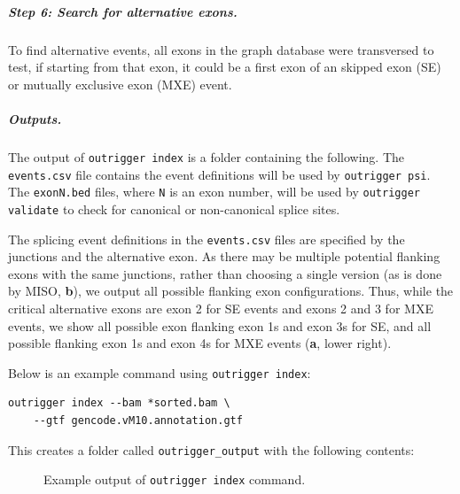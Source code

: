 \subparagraph{Step 6: Search for alternative exons.} To find alternative events, all exons in the graph database were transversed to test, if starting from that exon, it could be a first exon of an skipped exon (SE) or mutually exclusive exon (MXE) event.

\subparagraph{Outputs.} The output of \texttt{outrigger index} is a folder containing the following. The \texttt{events.csv} file contains the event definitions will be used by \texttt{outrigger psi}. The \texttt{exonN.bed} files, where \texttt{N} is an exon number, will be used by \texttt{outrigger validate} to check for canonical or non-canonical splice sites.

The splicing event definitions in the \texttt{events.csv} files are specified by the junctions and the alternative exon. As there may be multiple potential flanking exons with the same junctions, rather than choosing a single version (as is done by MISO, \textbf{b}), we output all possible flanking exon configurations. Thus, while the critical alternative exons are exon 2 for SE events and exons 2 and 3 for MXE events, we show all possible exon flanking exon 1s and exon 3s for SE, and all possible flanking exon 1s and exon 4s for MXE events (\textbf{a}, lower right).

Below is an example command using \texttt{outrigger index}:

\begin{verbatim}
outrigger index --bam *sorted.bam \
    --gtf gencode.vM10.annotation.gtf
\end{verbatim}

This creates a folder called \texttt{outrigger\_output} with the following contents:


\begin{figure}
\footnotesize
{}
\caption{Example output of \texttt{outrigger index} command.}
\end{figure}



